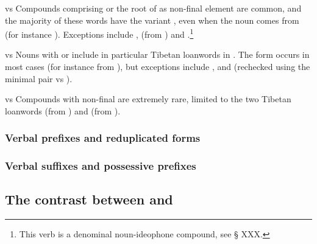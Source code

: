 \begin{paragraph}{ vs  }
Compounds comprising  or the root of  as non-final element are common, and the majority of these words have the variant , even when the noun comes from  (for instance ). Exceptions include ,  (from ) and .\footnote{This verb is a denominal noun-ideophone compound, see § XXX.}
\end{paragraph}
\begin{paragraph}{ vs  }
Nouns with  or  include in particular Tibetan loanwords in . The form  occurs in most cases (for instance  from ), but exceptions include ,  and  (rechecked using the minimal pair  vs ).
\end{paragraph}
\begin{paragraph}{ vs  }
Compounds with non-final   are extremely rare, limited to the two Tibetan loanwords  (from ) and  (from ).
\end{paragraph}
 

\subsubsection{Verbal prefixes and reduplicated forms}

\subsubsection{Verbal suffixes and possessive prefixes}

\subsection{The contrast between  and }